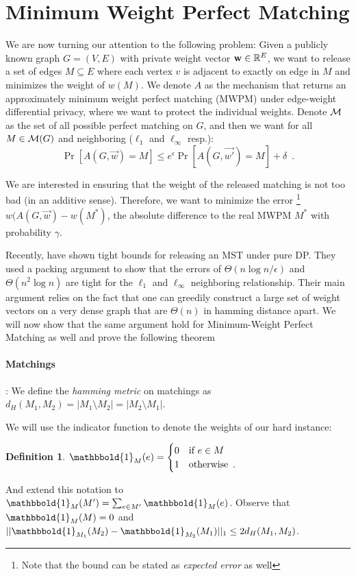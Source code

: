 \documentclass{article}
\newtheorem{definition}[theorem]{Definition}
\begin{document}
\section{Minimum Weight Perfect Matching}

We are now turning our attention to the following problem: 
Given a publicly known graph $G = (V, E)$ with private weight vector $\mathbf{w} \in \mathbb{R}^E$, we want to release a set of edges $M \subseteq E$ where each vertex $v$ is adjacent to exactly on edge in $M$ and minimizes the weight of $w(M)$. 
We denote $A$ as the mechanism that returns an approximately minimum weight perfect matching (MWPM) under edge-weight differential privacy, where we want to protect the individual weights.
Denote $\mathcal{M}$ as the set of all possible perfect matching on $G$, and then we want for all $M \in \mathcal{M}(G)$ and neighboring ($\ell_1$ and $\ell_\infty$ resp.):
\[
\Pr[A(G, \vec{w}) = M] \leq  e^\epsilon \Pr[A(G, \vec{w'}) = M] + \delta \enspace.
\]

We are interested in ensuring that the weight of the released matching is not too bad (in an additive sense).
Therefore, we want to minimize the error \footnote{Note that the bound can be stated as \emph{expected error} as well} $w(A(G, \vec{w}) - w(M^*)$, the absolute difference to the real MWPM $M^*$ with probability $\gamma$.

Recently, \citet{hladik2025} have shown tight bounds for releasing an MST under pure DP.
They used a packing argument to show that the errors of $\Theta(n \log n / \epsilon)$ and $\Theta(n^2 \log n)$ are tight for the $\ell_1$ and $\ell_\infty$ neighboring relationship.
Their main argument relies on the fact that one can greedily construct a large set of weight vectors on a very dense graph that are $\Theta(n)$ in hamming distance apart.
We will now show that the same argument hold for Minimum-Weight Perfect Matching as well and prove the following theorem

\paragraph{Matchings}: We define the \emph{hamming metric} on matchings as $d_H(M_1, M_2) = |M_1 \setminus M_2| = |M_2 \setminus M_1 |$.

We will use the indicator  function to denote the weights of our hard instance:
\begin{definition}
    $\mathbbold{1}_M(e)  = \begin{cases} 0 & \text{if~} e \in M \\ 1 & \text{otherwise} \enspace.  \end{cases}$
\end{definition}
And extend this notation to $\mathbbold{1}_M(M') = \sum_{e \in M'}\mathbbold{1}_M(e)$.
Observe that ${\mathbbold{1}_M(M) = 0}$ and $||\mathbbold{1}_{M_1}(M_2) - \mathbbold{1}_{M_2}(M_1)||_1 \leq 2 d_H(M_1, M_2)$.
\end{document}
